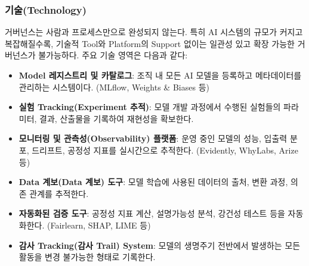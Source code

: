 \subsubsection*{기술(Technology)}
거버넌스는 사람과 프로세스만으로 완성되지 않는다. 특히 AI 시스템의 규모가 커지고 복잡해질수록, 기술적 Tool와 Platform의 Support 없이는 일관성 있고 확장 가능한 거버넌스가 불가능하다. 주요 기술 영역은 다음과 같다:
\begin{itemize}
 \item \textbf{Model 레지스트리 및 카탈로그}: 조직 내 모든 AI 모델을 등록하고 메타데이터를 관리하는 시스템이다. (MLflow, Weights \& Biases 등)
 \item \textbf{실험 Tracking(Experiment 추적)}: 모델 개발 과정에서 수행된 실험들의 파라미터, 결과, 산출물을 기록하여 재현성을 확보한다.
 \item \textbf{모니터링 및 관측성(Observability) 플랫폼}: 운영 중인 모델의 성능, 입출력 분포, 드리프트, 공정성 지표를 실시간으로 추적한다. (Evidently, WhyLabs, Arize 등)
 \item \textbf{Data 계보(Data 계보) 도구}: 모델 학습에 사용된 데이터의 출처, 변환 과정, 의존 관계를 추적한다.
 \item \textbf{자동화된 검증 도구}: 공정성 지표 계산, 설명가능성 분석, 강건성 테스트 등을 자동화한다. (Fairlearn, SHAP, LIME 등)
 \item \textbf{감사 Tracking(감사 Trail) System}: 모델의 생명주기 전반에서 발생하는 모든 활동을 변경 불가능한 형태로 기록한다.
\end{itemize}

